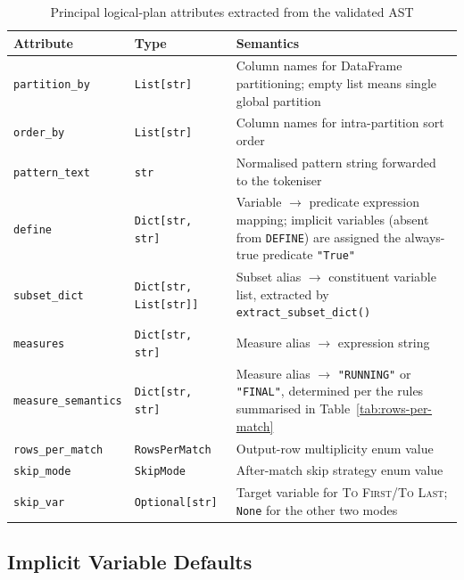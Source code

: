 \begin{table}[htbp]
  \centering
  \caption{Principal logical-plan attributes extracted from the
    validated AST}
  \label{tab:logical-plan}
  \begin{tabular}{llp{6.5cm}}
    \toprule
    \textbf{Attribute} & \textbf{Type} & \textbf{Semantics} \\
    \midrule
    \texttt{partition\_by}   & \texttt{List[str]}
      & Column names for DataFrame partitioning; empty list means
        single global partition \\[4pt]
    \texttt{order\_by}       & \texttt{List[str]}
      & Column names for intra-partition sort order \\[4pt]
    \texttt{pattern\_text}   & \texttt{str}
      & Normalised pattern string forwarded to the tokeniser \\[4pt]
    \texttt{define}          & \texttt{Dict[str, str]}
      & Variable $\to$ predicate expression mapping; implicit
        variables (absent from \texttt{DEFINE}) are assigned
        the always-true predicate \texttt{"True"} \\[4pt]
    \texttt{subset\_dict}    & \texttt{Dict[str, List[str]]}
      & Subset alias $\to$ constituent variable list, extracted
        by \texttt{extract\_subset\_dict()} \\[4pt]
    \texttt{measures}        & \texttt{Dict[str, str]}
      & Measure alias $\to$ expression string \\[4pt]
    \texttt{measure\_semantics} & \texttt{Dict[str, str]}
      & Measure alias $\to$ \texttt{"RUNNING"} or
        \texttt{"FINAL"}, determined per the rules summarised in
        Table~\ref{tab:rows-per-match} \\[4pt]
    \texttt{rows\_per\_match} & \texttt{RowsPerMatch}
      & Output-row multiplicity enum value \\[4pt]
    \texttt{skip\_mode}      & \texttt{SkipMode}
      & After-match skip strategy enum value \\[4pt]
    \texttt{skip\_var}       & \texttt{Optional[str]}
      & Target variable for \textsc{To First}/\textsc{To Last};
        \texttt{None} for the other two modes \\
    \bottomrule
  \end{tabular}
\end{table}

\subsection{Implicit Variable Defaults}
\label{subsec:logical-implicit}

